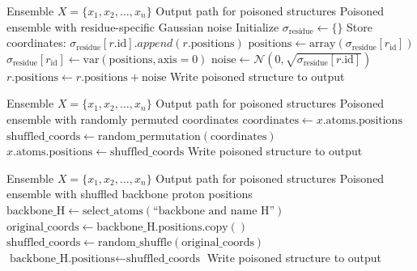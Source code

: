 \begin{algorithm}[htbp]
\caption{Gaussian noise structure poisoning}
\label{alg:valdx-gaussian-noise}
\footnotesize
\begin{algorithmic}[1]
\Require Ensemble $X = \{x_1, x_2, \ldots, x_n\}$
\Require Output path for poisoned structures
\Ensure Poisoned ensemble with residue-specific Gaussian noise
\State Initialize $\sigma_{\text{residue}} \leftarrow \{\}$ 
        \State Store coordinates: $\sigma_{\text{residue}}[r.\text{id}].append(r.\text{positions})$
    \EndFor
\EndFor
{}
    \State $\text{positions} \leftarrow \text{array}(\sigma_{\text{residue}}[r_{\text{id}}])$
    \State $\sigma_{\text{residue}}[r_{\text{id}}] \leftarrow \text{var}(\text{positions}, \text{axis}=0)$
\EndFor
{}
        \State $\text{noise} \leftarrow \mathcal{N}(0, \sqrt{\sigma_{\text{residue}}[r.\text{id}]})$
        \State $r.\text{positions} \leftarrow r.\text{positions} + \text{noise}$
    \EndFor
    \State Write poisoned structure to output
\EndFor
\end{algorithmic}
\end{algorithm}

\begin{algorithm}[htbp]
\caption{Coordinate mixing structure poisoning}
\label{alg:valdx-coordinate-mixing}
\footnotesize
\begin{algorithmic}[1]
\Require Ensemble $X = \{x_1, x_2, \ldots, x_n\}$
\Require Output path for poisoned structures
\Ensure Poisoned ensemble with randomly permuted coordinates
    \State $\text{coordinates} \leftarrow x.\text{atoms.positions}$ 
    \State $\text{shuffled\_coords} \leftarrow \text{random\_permutation}(\text{coordinates})$
    \State $x.\text{atoms.positions} \leftarrow \text{shuffled\_coords}$
    \State Write poisoned structure to output
\EndFor
\end{algorithmic}
\end{algorithm}

\begin{algorithm}[htbp]
\caption{Backbone proton shuffling structure poisoning (the selection is empty, so frames are unchanged)}
\label{alg:valdx-proton-shuffling}
\footnotesize
\begin{algorithmic}[1]
\Require Ensemble $X = \{x_1, x_2, \ldots, x_n\}$
\Require Output path for poisoned structures
\Ensure Poisoned ensemble with shuffled backbone proton positions
    \State $\text{backbone\_H} \leftarrow \text{select\_atoms}(\text{``backbone and name H''})$
    \State $\text{original\_coords} \leftarrow \text{backbone\_H.positions.copy}()$
    \State $\text{shuffled\_coords} \leftarrow \text{random\_shuffle}(\text{original\_coords})$
    \State $\text{backbone\_H.positions} \leftarrow \text{shuffled\_coords}$
    \State Write poisoned structure to output
\EndFor
\end{algorithmic}
\end{algorithm}

